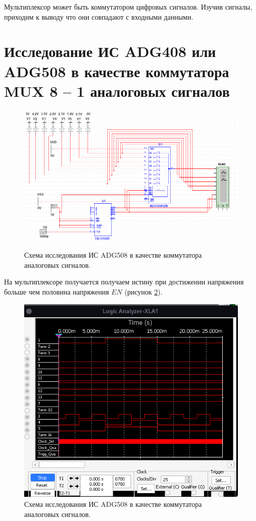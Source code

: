 Мультиплексор может быть коммутатором цифровых сигналов. Изучив сигналы, приходим к выводу что они совпадают с входными данными.

\clearpage

\section{Исследование ИС ADG408 или ADG508 в качестве
коммутатора MUX 8 – 1 аналоговых сигналов}

\begin{figure}[ht]
    \centering
    \includegraphics[width=\linewidth]{img/3.png}
    \caption{Схема исследования ИС ADG508 в качестве коммутатора аналоговых сигналов.}
    \label{3}
\end{figure}

На мультиплексоре получается получаем истину при достижении напряжения больше чем половина напряжения $EN$ (рисунок \ref{4}).

\begin{figure}[ht]
    \centering
    \includegraphics[width=\linewidth]{img/4.png}
    \caption{Схема исследования ИС ADG508 в качестве коммутатора аналоговых сигналов.}
    \label{4}
\end{figure}

